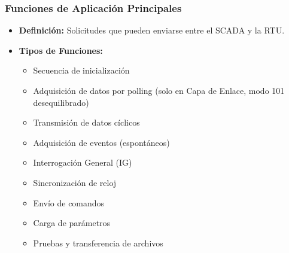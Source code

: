 \documentclass[a5paper]{book}%
\begin{document}
\subsubsection{Funciones de Aplicación Principales}
\begin{itemize}
	\item \textbf{Definición:} Solicitudes que pueden enviarse entre el SCADA y la RTU.
	\item \textbf{Tipos de Funciones:}
	\begin{itemize}
		\item Secuencia de inicialización
		\item Adquisición de datos por polling (solo en Capa de Enlace, modo 101 desequilibrado)
		\item Transmisión de datos cíclicos
		\item Adquisición de eventos (espontáneos)
		\item Interrogación General (IG)
		\item Sincronización de reloj
		\item Envío de comandos
		\item Carga de parámetros
		\item Pruebas y transferencia de archivos
	\end{itemize}
\end{itemize}
\end{document}
